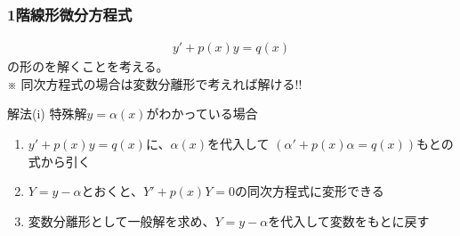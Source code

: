\documentclass[a4paper]{jsarticle}
\begin{document}
\subsubsection{1階線形微分方程式}
\begin{eqnarray*}
    y'+p\left(x\right)y=q\left(x\right)
\end{eqnarray*}
の形のを解くことを考える。\\
※ 同次方程式の場合は変数分離形で考えれば解ける!!\\
\begin{itembox}[l]{解法(i) 特殊解$y=\alpha\left(x\right)$がわかっている場合}
    \begin{enumerate}[(1)]
        \item $y'+p\left(x\right)y=q\left(x\right)$に、$\alpha\left(x\right)$を代入して
              $\left(\alpha'+p\left(x\right)\alpha=q\left(x\right)\right)$もとの式から引く
        \item $Y=y-\alpha$とおくと、$Y'+p\left(x\right)Y=0$の同次方程式に変形できる
        \item 変数分離形として一般解を求め、$Y=y-\alpha$を代入して変数をもとに戻す
    \end{enumerate}
\end{itembox}
\begin{center}
\end{center}
\end{document}
